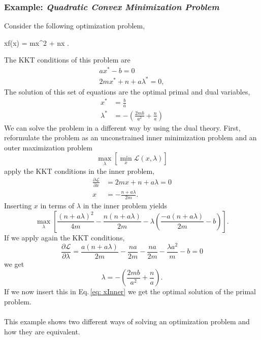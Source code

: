 \subsubsection{Example: \textit{Quadratic Convex Minimization Problem}}
Consider the following optimization problem,
\begin{mini!}[2]
	{x}{f(x) = mx^{2} + nx}{}{}{\quad {}}
	.
\end{mini!}
The KKT conditions of this problem are
\begin{align}
    ax^{*}-b=0 \\
    2mx^{*}+n + a\lambda^{*}= 0,
\end{align}
The solution of this set of equations are the optimal primal and dual variables,
\begin{align}
    x^{*} &= \frac{b}{a} \\
    \lambda^{*} &= - \left(\frac{2mb}{a^{2}} + \frac{n}{a}\right)
\end{align}
We can solve the problem in a different way by using the dual theory. First, reformulate the problem as an unconstrained inner minimization problem and an outer maximization problem
\begin{equation}
    \max_{\lambda}\left[\min_{x}\mathcal{L}(x,\lambda)\right]
\end{equation}
apply the KKT conditions in the inner problem,
\begin{align}
    \frac{\partial \mathcal{L}}{\partial x} &= 2mx + n + a\lambda = 0 \\
    x &= - \frac{n + a\lambda}{2m}\label{eq: xInner}.
\end{align}
Inserting $x$ in terms of $\lambda$ in the inner problem yields
\begin{equation}
    \max_{\lambda} \left[\frac{(n+a\lambda)^{2}}{4m} - \frac{n(n+a\lambda)}{2m} - \lambda\left(\frac{-a(n+a\lambda)}{2m} - b\right)\right].
\end{equation}
If we apply again the KKT conditions,
\begin{equation}
    \frac{\partial \mathcal{L}}{\partial \lambda} = \frac{a(n + a\lambda)}{2m} - \frac{na}{2m} - \frac{na}{2m} - \frac{\lambda a^{2}}{m} - b = 0
\end{equation}
we get
\begin{equation}
    \lambda = - \left(\frac{2mb}{a^{2}} + \frac{n}{a}\right).
\end{equation}
If we now insert this in Eq.\,\eqref{eq: xInner} we get the optimal solution of the primal problem.\\\\
This example shows two different ways of solving an optimization problem and how they are equivalent.
